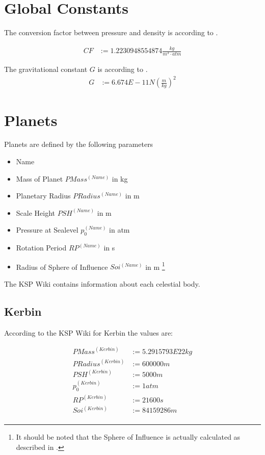 \documentclass[11pt]{report}
\begin{document}
\section{Global Constants}

The  conversion factor between pressure and
density is according to \cite{Atmo}.

\begin{align}
  CF &:= 1.2230948554874 \frac{kg}{m^3\cdot atm}
\end{align}

The  gravitational constant $G$ is according to \cite{ACB}.
\begin{align}
  G &:= 6.674E-11 N\left(\frac{m}{kg}\right)^2
\end{align}

\section{Planets}

Planets are defined by the following parameters

\begin{itemize}
\item Name
\item {} Mass of Planet $PMass^{(Name)}$ in kg
\item {} Planetary Radius $PRadius^{(Name)}$ in m
\item {} Scale Height $PSH^{(Name)}$ in m
\item {} Pressure at Sealevel $p_0^{(Name)}$ in atm
\item {} Rotation Period $RP^{(Name)}$ in s
\item {} Radius of Sphere of Influence $Soi^{(Name)}$ in m \footnote{It should be noted that the Sphere of Influence is actually calculated
as described in \cite{SphereOfInfluence}.}
\end{itemize}

The KSP Wiki \cite{Wiki} contains information about each celestial
body.

\subsection{Kerbin}

According to the KSP Wiki for Kerbin the values are:

\begin{align*}
  PMass^{(Kerbin)} &:= 5.2915793E22 kg\\
  PRadius^{(Kerbin)} &:= 600000 m\\
  PSH^{(Kerbin)} &:= 5000 m\\
  p_0^{(Kerbin)} &:= 1 atm\\
  RP^{(Kerbin)} &:= 21600 s\\
  Soi^{(Kerbin)} &:= 84159286 m\\
\end{align*}
\end{document}
